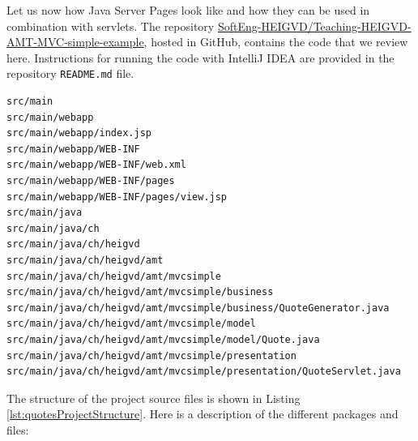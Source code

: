 Let us now how Java Server Pages look like and how they can be used in combination with servlets. The repository \href{https://github.com/SoftEng-HEIGVD/Teaching-HEIGVD-AMT-MVC-simple-example}{SoftEng-HEIGVD/Teaching-HEIGVD-AMT-MVC-simple-example}, hosted in GitHub, contains the code that we review here. Instructions for running the code with IntelliJ IDEA are provided in the repository \texttt{README.md} file.

\vspace{10pt}
\begin{minipage}{\linewidth}
\begin{lstlisting}[frame=single]
src/main
src/main/webapp
src/main/webapp/index.jsp
src/main/webapp/WEB-INF
src/main/webapp/WEB-INF/web.xml
src/main/webapp/WEB-INF/pages
src/main/webapp/WEB-INF/pages/view.jsp
src/main/java
src/main/java/ch
src/main/java/ch/heigvd
src/main/java/ch/heigvd/amt
src/main/java/ch/heigvd/amt/mvcsimple
src/main/java/ch/heigvd/amt/mvcsimple/business
src/main/java/ch/heigvd/amt/mvcsimple/business/QuoteGenerator.java
src/main/java/ch/heigvd/amt/mvcsimple/model
src/main/java/ch/heigvd/amt/mvcsimple/model/Quote.java
src/main/java/ch/heigvd/amt/mvcsimple/presentation
src/main/java/ch/heigvd/amt/mvcsimple/presentation/QuoteServlet.java
\end{lstlisting}
\end{minipage}

The structure of the project source files is shown in Listing \ref{lst:quotesProjectStructure}. Here is a description of the different packages and files:

